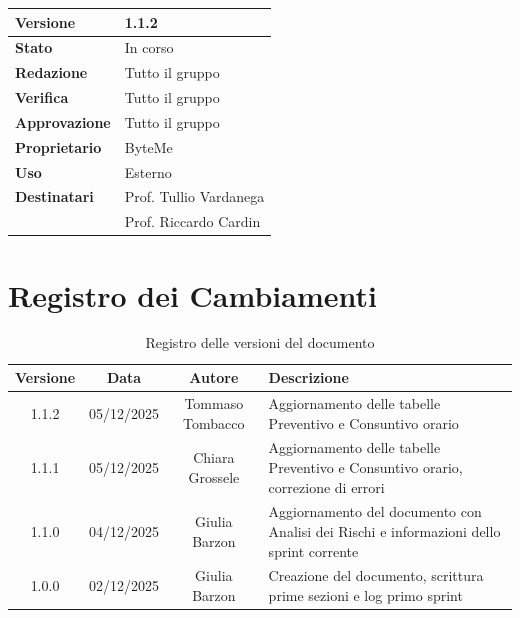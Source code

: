 \documentclass[11pt,a4paper]{article}
\begin{document}
\begin{titlepage}
    \begin{table}[H]
        \centering
        \begin{tabular}{|l|p{5cm}|}
            \hline
            \textbf{Versione} & 1.1.2 \\
            \hline
            \textbf{Stato} & In corso \\
            \hline
            \textbf{Redazione} & Tutto il gruppo \\
            \hline
            \textbf{Verifica} & Tutto il gruppo \\
            \hline
            \textbf{Approvazione} & Tutto il gruppo \\
            \hline
            \textbf{Proprietario} & ByteMe \\
            \hline
            \textbf{Uso} & Esterno \\
            \hline
            \textbf{Destinatari} & Prof. Tullio Vardanega \\ & Prof. Riccardo Cardin \\
            \hline
        \end{tabular}
    \end{table}
    
    \vfill
\end{titlepage}

\thispagestyle{empty}
\section*{Registro dei Cambiamenti}

\begin{table}[H]
    \centering
    \begin{tabular}{|c|c|c|>{\raggedright\arraybackslash}p{}|}
        \hline
        \textbf{Versione} & \textbf{Data} & \textbf{Autore} & \textbf{Descrizione} \\
        \hline
        1.1.2 & 05/12/2025 & Tommaso Tombacco & Aggiornamento delle tabelle Preventivo e Consuntivo orario\\
        \hline
        1.1.1 & 05/12/2025 & Chiara Grossele & Aggiornamento delle tabelle Preventivo e Consuntivo orario, correzione di errori\\
        \hline
        1.1.0 & 04/12/2025 & Giulia Barzon & Aggiornamento del documento con Analisi dei Rischi e informazioni dello sprint corrente\\
        \hline
        1.0.0 & 02/12/2025 & Giulia Barzon & Creazione del documento, scrittura prime sezioni e log primo sprint \\
        \hline
    \end{tabular}
    \caption{Registro delle versioni del documento}
    \label{tab:versionamento}
\end{table}
\end{document}
